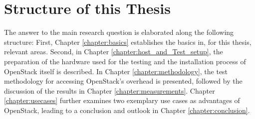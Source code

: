     \section{Structure of this Thesis}
    \label{section:structure}
        
        The answer to the main research question is elaborated along the following structure:
        First, Chapter \ref{chapter:basics} establishes the basics in, for this thesis, relevant areas.
        Second, in Chapter \ref{chapter:host_and_Test_setup}, the preparation of the hardware used for the testing and the installation process of OpenStack itself is described.
        In Chapter \ref{chapter:methodology}, the test methodology for accessing OpenStack's overhead is presented, followed by the discussion of the results in Chapter \ref{chapter:measurements}.
        Chapter \ref{chapter:usecases} further examines two exemplary use cases as advantages of OpenStack, leading to a conclusion and outlook in Chapter \ref{chapter:conclusion}.

    

